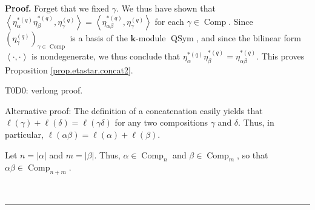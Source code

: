\documentclass[numbers=enddot,12pt,final,onecolumn,notitlepage]{scrartcl}%
\theoremstyle{definition}
\newenvironment{proof}[1][Proof]{\noindent\textbf{#1.} }{\ \rule{0.5em}{0.5em}}
\newenvironment{verlong}{}{}
\newenvironment{noncompile}{}{}
\begin{document}
\begin{proof}
Forget that we fixed $\gamma$. We thus have shown that $\left\langle
\eta_{\alpha}^{\ast\left(  q\right)  }\eta_{\beta}^{\ast\left(  q\right)
},\eta_{\gamma}^{\left(  q\right)  }\right\rangle =\left\langle \eta
_{\alpha\beta}^{\ast\left(  q\right)  },\eta_{\gamma}^{\left(  q\right)
}\right\rangle $ for each $\gamma\in\operatorname*{Comp}$. Since $\left(
\eta_{\gamma}^{\left(  q\right)  }\right)  _{\gamma\in\operatorname*{Comp}}$
is a basis of the $\mathbf{k}$-module $\operatorname*{QSym}$, and since the
bilinear form $\left\langle \cdot,\cdot\right\rangle $ is nondegenerate, we
thus conclude that $\eta_{\alpha}^{\ast\left(  q\right)  }\eta_{\beta}%
^{\ast\left(  q\right)  }=\eta_{\alpha\beta}^{\ast\left(  q\right)  }$. This
proves Proposition \ref{prop.etastar.concat2}. \qedhere


\begin{verlong}
T0D0: verlong proof.
\end{verlong}

\begin{noncompile}
Alternative proof: The definition of a concatenation easily yields that
$\ell\left(  \gamma\right)  +\ell\left(  \delta\right)  =\ell\left(
\gamma\delta\right)  $ for any two compositions $\gamma$ and $\delta$. Thus,
in particular, $\ell\left(  \alpha\beta\right)  =\ell\left(  \alpha\right)
+\ell\left(  \beta\right)  $.

Let $n=\left\vert \alpha\right\vert $ and $m=\left\vert \beta\right\vert $.
Thus, $\alpha\in\operatorname*{Comp}\nolimits_{n}$ and $\beta\in
\operatorname*{Comp}\nolimits_{m}$, so that $\alpha\beta\in
\operatorname*{Comp}\nolimits_{n+m}$.


\end{noncompile}
\end{proof}
\end{document}

